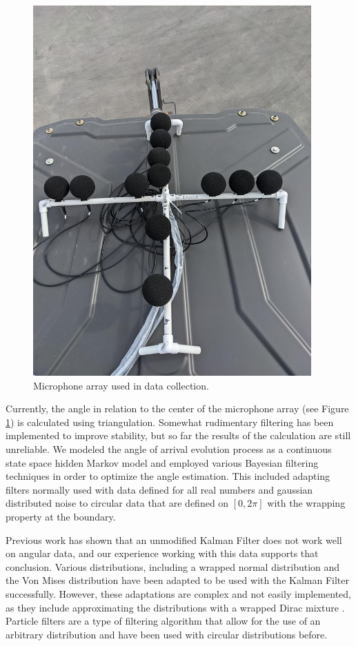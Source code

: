 \documentclass[11pt]{amsart}
\begin{document}
\begin{figure}
\includegraphics*[width=0.95\textwidth]{Pic of Real Mic Array.jpg}\hfill
\caption{Microphone array used in data collection.}
\label{fig:array}
\end{figure}

Currently, the angle in relation to the center of the microphone array (see Figure \ref{fig:array}) is calculated using triangulation. Somewhat rudimentary filtering has been implemented to 
improve stability, but so far the results of the calculation are still unreliable. We modeled the angle of arrival evolution process as a continuous state space 
hidden Markov model and employed various Bayesian filtering techniques in order to optimize the angle estimation. This included adapting filters normally used 
with data defined for all real numbers and gaussian distributed noise to circular data that are defined on $[0,2\pi]$ with the wrapping property at the boundary.

Previous work has shown that an unmodified Kalman Filter does not work well on angular data, and our experience working with this data supports that conclusion. 
Various distributions, including a wrapped normal distribution and the Von Mises distribution have been adapted to be used with the Kalman Filter successfully. 
However, these adaptations are complex and not easily implemented, as they include approximating the distributions with a wrapped Dirac mixture \cite{Research}. Particle filters 
are a type of filtering algorithm that allow for the use of an arbitrary distribution and have been used with circular distributions before.
\end{document}
